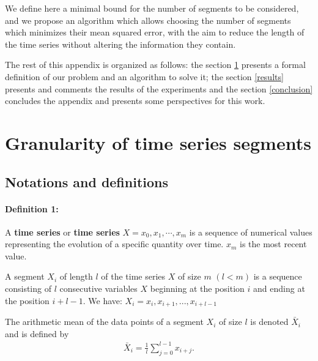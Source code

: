  
 
 We define here a minimal bound for the number of segments to be considered, and we propose an algorithm which allows choosing the number of segments which minimizes their mean squared error, with the aim to reduce the length of the time series without altering the information they contain.
 
 
  The rest of this appendix is organized as follows: the  section \ref{probleme22} presents a formal definition of our problem and an algorithm  to solve it; the section \ref{results} presents and comments the results of the experiments and the section \ref{conclusion} concludes the appendix and presents some perspectives for this work.
 

\section{Granularity of time series segments}
\label{probleme22}


\subsection{Notations and definitions}
\paragraph{Definition 1:} A \textbf{time series} or \textbf{time series}
$ X = x_{0}, x_{1}, \cdots, x_{m} $ is a sequence of numerical values representing the evolution of a specific quantity over time. $ x_{m} $ is the most recent value.

\begin{definition}
A segment $ X_{i} $ of length $ l $ of the time series
$ X $ of size $ m $ $ (l <m) $ is a sequence consisting of $ l $ consecutive variables
$ X $ beginning at the  position  $ i $  and ending at the position $ i + l-1 $.
We have: $ X_{i} = x_{i}, x_{i + 1}, ..., x_{i + l-1} $
\end{definition}

 
\begin{definition}
The arithmetic mean of the data points of a segment $ X_{i} $ of size $ l $ is
denoted $ \bar {X}_{i} $ and is defined by
	\begin{eqnarray}
		\bar{X}_{i} = \frac{1}{l} \sum_{j = 0}^{l-1} x_{i + j}.
	\end{eqnarray}

\end{definition}





